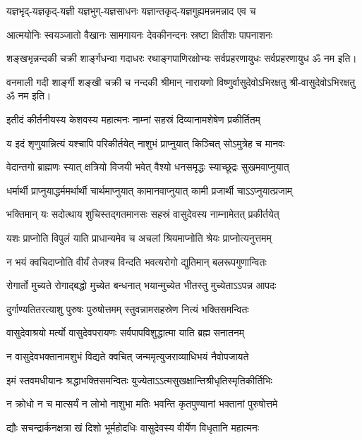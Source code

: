 \twolineshloka
{यज्ञभृद्-यज्ञकृद्-यज्ञी यज्ञभुग्-यज्ञसाधनः}
{यज्ञान्तकृद्-यज्ञगुह्यमन्नमन्नाद एव च}

\twolineshloka
{आत्मयोनिः स्वयञ्जातो वैखानः सामगायनः}
{देवकीनन्दनः स्रष्टा क्षितीशः पापनाशनः}

\twolineshloka
{शङ्खभृन्नन्दकी चक्री शार्ङ्गधन्वा गदाधरः}
{रथाङ्गपाणिरक्षोभ्यः सर्वप्रहरणायुधः}
सर्वप्रहरणायुध ॐ नम इति।

\twolineshloka
{वनमाली गदी शार्ङ्गी शङ्खी चक्री च नन्दकी}
{श्रीमान् नारायणो विष्णुर्वासुदेवोऽभिरक्षतु}%
श्री-वासुदेवोऽभिरक्षतु ॐ नम इति।

\resetShloka
\twolineshloka
{इतीदं कीर्तनीयस्य केशवस्य महात्मनः}
{नाम्नां सहस्रं दिव्यानामशेषेण प्रकीर्तितम्}

\twolineshloka
{य इदं शृणुयान्नित्यं यश्चापि परिकीर्तयेत्}
{नाशुभं प्राप्नुयात् किञ्चित् सोऽमुत्रेह च मानवः}

\twolineshloka
{वेदान्तगो ब्राह्मणः स्यात् क्षत्रियो विजयी भवेत्}
{वैश्यो धनसमृद्धः स्याच्छूद्रः सुखमवाप्नुयात्}

\twolineshloka
{धर्मार्थी प्राप्नुयाद्धर्ममर्थार्थी चार्थमाप्नुयात्}
{कामानवाप्नुयात् कामी प्रजार्थी चाऽऽप्नुयात्प्रजाम्}

\twolineshloka
{भक्तिमान् यः सदोत्थाय शुचिस्तद्गतमानसः}
{सहस्रं वासुदेवस्य नाम्नामेतत् प्रकीर्तयेत्}

\twolineshloka
{यशः प्राप्नोति विपुलं याति प्राधान्यमेव च}
{अचलां श्रियमाप्नोति श्रेयः प्राप्नोत्यनुत्तमम्}

\twolineshloka
{न भयं क्वचिदाप्नोति वीर्यं तेजश्च विन्दति}
{भवत्यरोगो द्युतिमान् बलरूपगुणान्वितः}

\twolineshloka
{रोगार्तो मुच्यते रोगाद्बद्धो मुच्येत बन्धनात्}
{भयान्मुच्येत भीतस्तु मुच्येताऽऽपन्न आपदः}

\twolineshloka
{दुर्गाण्यतितरत्याशु पुरुषः पुरुषोत्तमम्}
{स्तुवन्नामसहस्रेण नित्यं भक्तिसमन्वितः}

\twolineshloka
{वासुदेवाश्रयो मर्त्यो वासुदेवपरायणः}
{सर्वपापविशुद्धात्मा याति ब्रह्म सनातनम्}

\twolineshloka
{न वासुदेवभक्तानामशुभं विद्यते क्वचित्}
{जन्ममृत्युजराव्याधिभयं नैवोपजायते}

\twolineshloka
{इमं स्तवमधीयानः श्रद्धाभक्तिसमन्वितः}
{युज्येताऽऽत्मसुखक्षान्तिश्रीधृतिस्मृतिकीर्तिभिः}

\twolineshloka
{न क्रोधो न च मात्सर्यं न लोभो नाशुभा मतिः}
{भवन्ति कृतपुण्यानां भक्तानां पुरुषोत्तमे}

\twolineshloka
{द्यौः सचन्द्रार्कनक्षत्रा खं दिशो भूर्महोदधिः}
{वासुदेवस्य वीर्येण विधृतानि महात्मनः}

